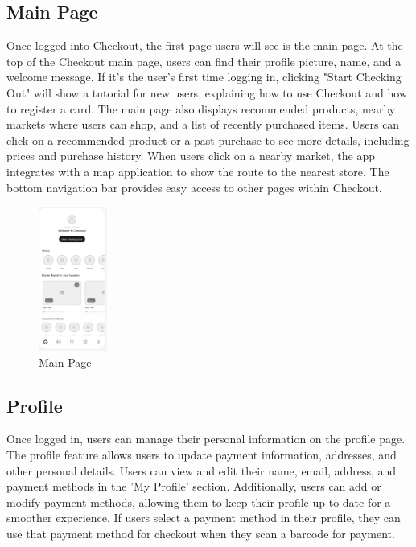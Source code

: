\documentclass[conference]{IEEEtran}
\begin{document}
\subsection{Main Page}
Once logged into Checkout, the first page users will see is the main page. At the top of the Checkout main page, users can find their profile picture, name, and a welcome message. If it's the user's first time logging in, clicking "Start Checking Out" will show a tutorial for new users, explaining how to use Checkout and how to register a card.
The main page also displays recommended products, nearby markets where users can shop, and a list of recently purchased items. Users can click on a recommended product or a past purchase to see more details, including prices and purchase history.
When users click on a nearby market, the app integrates with a map application to show the route to the nearest store. The bottom navigation bar provides easy access to other pages within Checkout.
\begin{figure}[H]  %
    \centering  %
    \includegraphics[width=0.2\textwidth]{main.PNG}  %
    \caption{Main Page}  %
\end{figure}

\subsection{Profile}
Once logged in, users can manage their personal information on the profile page. The profile feature allows users to update payment information, addresses, and other personal details. Users can view and edit their name, email, address, and payment methods in the 'My Profile' section. Additionally, users can add or modify payment methods, allowing them to keep their profile up-to-date for a smoother experience.
If users select a payment method in their profile, they can use that payment method for checkout when they scan a barcode for payment.
\end{document}
